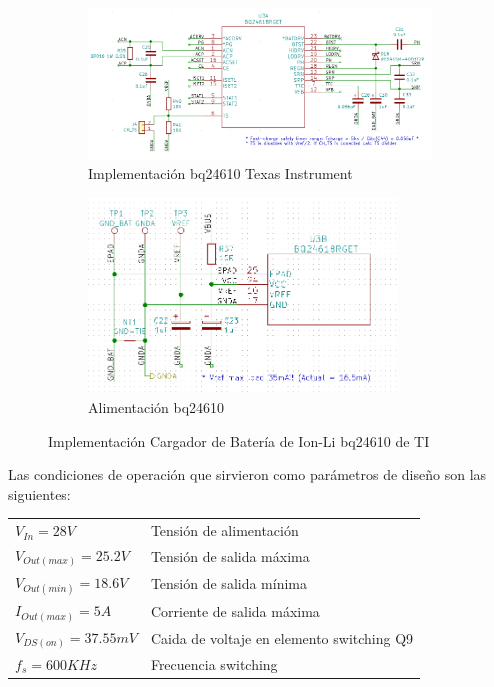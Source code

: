 \documentclass[10pt,a4paper]{article}
\begin{document}
\begin{figure}[h!]
    \centering
    \begin{subfigure}[t]{0.6\textwidth}
        \centering
        \includegraphics[width=1.1\textwidth]{hardware/bat_charger/bc_ic.png}
        \caption{Implementación bq24610 Texas Instrument}
        \label{fig:bc_ic_ti}
    \end{subfigure}
    \hfill
    \begin{subfigure}[t]{0.35\textwidth}
        \centering
        \includegraphics[width=0.9\textwidth]{hardware/bat_charger/bc_ic_power_supply.png}
        \caption{Alimentación bq24610}
        \label{fig:bc_ic_power_supply}
    \end{subfigure}
    \caption{Implementación Cargador de Batería de Ion-Li bq24610 de TI}
    \label{fig:bc_ic}
\end{figure}
\FloatBarrier

Las condiciones de operación que sirvieron como parámetros de diseño son las
siguientes:

\begin{tabular}{ll}
    $V_{In}=28V$ &Tensión de alimentación \\
    $V_{Out (max)}=25.2V$ &Tensión de salida máxima\\
    $V_{Out (min)}=18.6V$ &Tensión de salida mínima\\
    $I_{Out (max)}=5A$ &Corriente de salida máxima\\
    $V_{DS (on)}=37.55mV$ &Caida de voltaje en elemento switching Q9\\
    $f_{s}=600 KHz$ &Frecuencia switching\\
\end{tabular}
\end{document}

